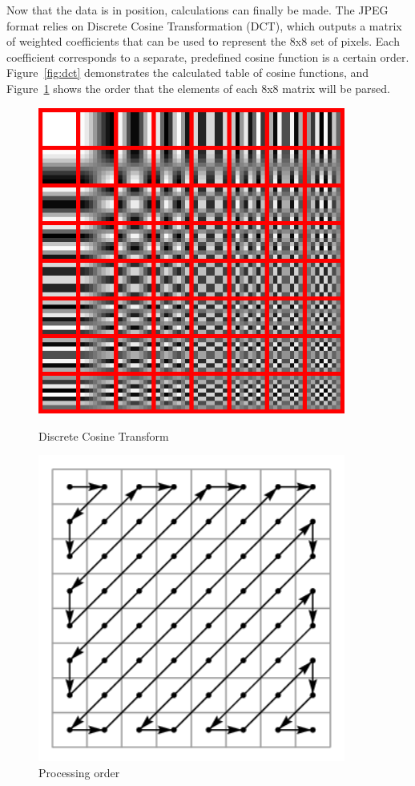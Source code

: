 \documentclass[11pt]{article}
\begin{document}
Now that the data is in position, calculations can finally be made.
The JPEG format relies on Discrete Cosine Transformation (DCT), which outputs a matrix of weighted coefficients that can be used to represent the 8x8 set of pixels.
Each coefficient corresponds to a separate, predefined cosine function is a certain order.
Figure~\ref{fig:dct} demonstrates the calculated table of cosine functions, and Figure~\ref{fig:dct_order} shows the order that the elements of each 8x8 matrix will be parsed.
\begin{figure}
  \centering
  \begin{minipage}{0.45\textwidth}
      \centering
      \includegraphics[width=0.9\textwidth]{./images/dct.png}
      \caption{Discrete Cosine Transform}
      \label{fig:dct}
  \end{minipage}\hfill
  \begin{minipage}{0.45\textwidth}
      \centering
      \includegraphics[width=0.9\textwidth]{./images/dct_order.png}
      \caption{Processing order}
      \label{fig:dct_order}
  \end{minipage}
\end{figure}
\end{document}
